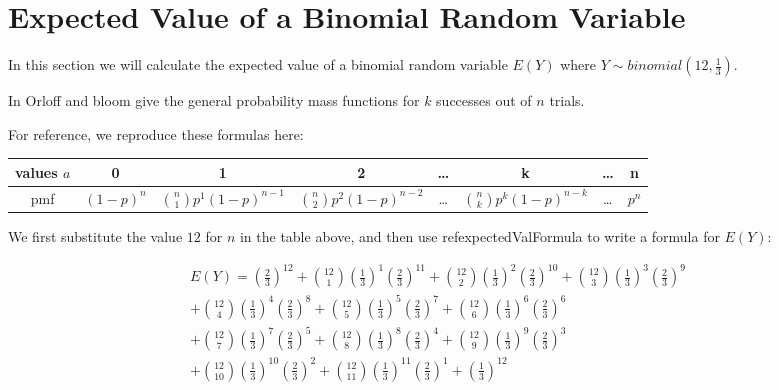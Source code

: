 \documentclass[a4paper,11pt]{article}
\begin{document}
\section{Expected Value of a Binomial Random Variable}
In this section we will calculate the expected value of a binomial
random variable $ E \left( Y \right) $ where $Y \sim binomial \left( 12,
 \frac{1}{3} \right)$.
 
In \cite{reading4} Orloff and bloom give the general probability mass
functions for $k$ successes out of $n$ trials.

For reference, we reproduce these formulas here:

\begin{center}
  \begin{tabular}{ | c | c | c | c | c |c | c | c |}
    \hline
    values $a$ & 0 & 1 & 2 & \ldots & k & \ldots & n \\ \hline
    pmf & $ \left( 1 - p \right)^{n}$ 
      & $ \binom{n}{1} p^{1} \left( 1 - p \right)^{n-1} $
     & $ \binom{n}{2} p^{2} \left( 1 - p \right)^{n-2}$
     & \ldots 
     & $ \binom{n}{k} p^{k} \left ( 1 - p \right)^{n-k}$
     &  \ldots
     & $ p^{n} $ \\ \hline
  \end{tabular}
\end{center}

We first substitute the value $12$ for $n$ in the table above, and
then use ref{expectedValFormula} to write a formula for
$E \left( Y \right) $:

\begin{equation} \label{binomialExplosion}
\begin{split}
E \left( Y \right) = \left( \frac{2}{3} \right)^{12}
  + \binom{12}{1} \left( \frac{1}{3} \right)^{1} \left( \frac{2}{3} \right)^{11}
  + \binom{12}{2} \left( \frac{1}{3} \right)^{2} \left( \frac{2}{3} \right)^{10}
  + \binom{12}{3} \left( \frac{1}{3} \right)^{3} \left( \frac{2}{3} \right)^{9} \\
  + \binom{12}{4} \left( \frac{1}{3} \right)^{4} \left( \frac{2}{3} \right)^{8}
  + \binom{12}{5} \left( \frac{1}{3} \right)^{5} \left( \frac{2}{3} \right)^{7}
  + \binom{12}{6} \left( \frac{1}{3} \right)^{6} \left( \frac{2}{3} \right)^{6} \\
  + \binom{12}{7} \left( \frac{1}{3} \right)^{7} \left( \frac{2}{3} \right)^{5}
  + \binom{12}{8} \left( \frac{1}{3} \right)^{8} \left( \frac{2}{3} \right)^{4}
  + \binom{12}{9} \left( \frac{1}{3} \right)^{9} \left( \frac{2}{3} \right)^{3} \\
  + \binom{12}{10} \left( \frac{1}{3} \right)^{10} \left( \frac{2}{3} \right)^{2}
  + \binom{12}{11} \left( \frac{1}{3} \right)^{11} \left( \frac{2}{3} \right)^{1}
  + \left( \frac{1}{3} \right)^{12}
\end{split}
\end{equation}
 
\end{document}
